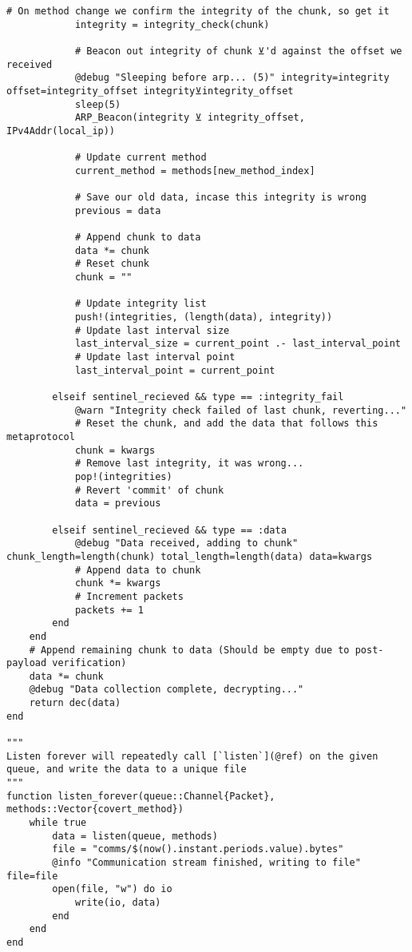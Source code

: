 \begin{lstlisting}[language=JuliaLocal, style=julia]
            # On method change we confirm the integrity of the chunk, so get it
            integrity = integrity_check(chunk)

            # Beacon out integrity of chunk ⊻'d against the offset we received
            @debug "Sleeping before arp... (5)" integrity=integrity offset=integrity_offset integrity⊻integrity_offset
            sleep(5)
            ARP_Beacon(integrity ⊻ integrity_offset, IPv4Addr(local_ip))
            
            # Update current method
            current_method = methods[new_method_index]

            # Save our old data, incase this integrity is wrong
            previous = data

            # Append chunk to data
            data *= chunk
            # Reset chunk
            chunk = ""

            # Update integrity list
            push!(integrities, (length(data), integrity))
            # Update last interval size
            last_interval_size = current_point .- last_interval_point
            # Update last interval point
            last_interval_point = current_point
        
        elseif sentinel_recieved && type == :integrity_fail
            @warn "Integrity check failed of last chunk, reverting..."
            # Reset the chunk, and add the data that follows this metaprotocol
            chunk = kwargs
            # Remove last integrity, it was wrong...
            pop!(integrities)
            # Revert 'commit' of chunk
            data = previous
        
        elseif sentinel_recieved && type == :data
            @debug "Data received, adding to chunk" chunk_length=length(chunk) total_length=length(data) data=kwargs
            # Append data to chunk
            chunk *= kwargs
            # Increment packets
            packets += 1
        end
    end
    # Append remaining chunk to data (Should be empty due to post-payload verification)
    data *= chunk
    @debug "Data collection complete, decrypting..."
    return dec(data)
end

"""
Listen forever will repeatedly call [`listen`](@ref) on the given queue, and write the data to a unique file
"""
function listen_forever(queue::Channel{Packet}, methods::Vector{covert_method})
    while true
        data = listen(queue, methods)
        file = "comms/$(now().instant.periods.value).bytes"
        @info "Communication stream finished, writing to file" file=file
        open(file, "w") do io
            write(io, data)
        end
    end
end

\end{lstlisting}
